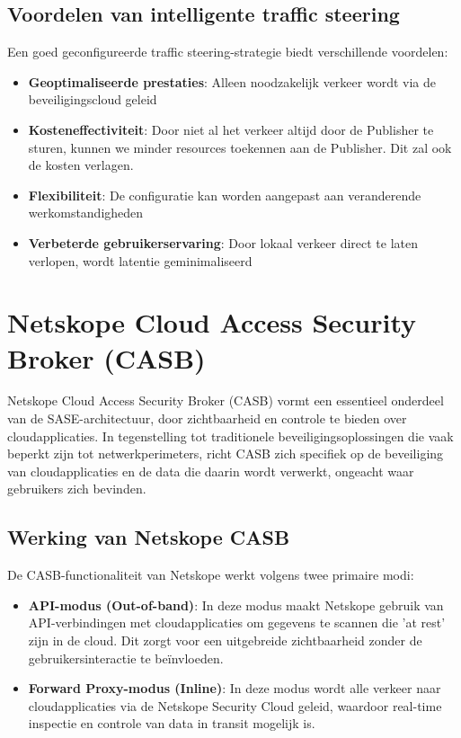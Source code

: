 \subsection{Voordelen van intelligente traffic steering}

Een goed geconfigureerde traffic steering-strategie biedt verschillende voordelen:
\begin{itemize}
    \item \textbf{Geoptimaliseerde prestaties}: Alleen noodzakelijk verkeer wordt via de beveiligingscloud geleid
    \item \textbf{Kosteneffectiviteit}: Door niet al het verkeer altijd door de Publisher te sturen, kunnen we minder resources toekennen aan de Publisher. Dit zal ook de kosten verlagen.
    \item \textbf{Flexibiliteit}: De configuratie kan worden aangepast aan veranderende werkomstandigheden
    \item \textbf{Verbeterde gebruikerservaring}: Door lokaal verkeer direct te laten verlopen, wordt latentie geminimaliseerd
\end{itemize}


\section{Netskope Cloud Access Security Broker (CASB)}
Netskope Cloud Access Security Broker (CASB) vormt een essentieel onderdeel van de SASE-architectuur, door zichtbaarheid en controle te bieden over cloudapplicaties. In tegenstelling tot traditionele beveiligingsoplossingen die vaak beperkt zijn tot netwerkperimeters, richt CASB zich specifiek op de beveiliging van cloudapplicaties en de data die daarin wordt verwerkt, ongeacht waar gebruikers zich bevinden.

\subsection{Werking van Netskope CASB}
 
De CASB-functionaliteit van Netskope werkt volgens twee primaire modi:

\begin{itemize}
    \item \textbf{API-modus (Out-of-band)}: In deze modus maakt Netskope gebruik van API-verbindingen met cloudapplicaties om gegevens te scannen die 'at rest' zijn in de cloud. Dit zorgt voor een uitgebreide zichtbaarheid zonder de gebruikersinteractie te beïnvloeden.

    \item \textbf{Forward Proxy-modus (Inline)}: In deze modus wordt alle verkeer naar cloudapplicaties via de Netskope Security Cloud geleid, waardoor real-time inspectie en controle van data in transit mogelijk is.
\end{itemize}

